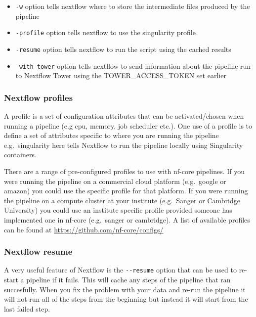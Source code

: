 \documentclass[11pt]{article}
\providecommand{\tightlist}{%
      \setlength{\itemsep}{0pt}\setlength{\parskip}{0pt}}
\begin{document}
\begin{itemize}
\tightlist
\item
  \texttt{-w} option tells nextflow where to store the intermediate
  files produced by the pipeline\\
\item
  \texttt{-profile} option tells nextflow to use the singularity
  profile\\
\item
  \texttt{-resume} option tells nextflow to run the script using the
  cached results\\
\item
  \texttt{-with-tower} option tells nextflow to send information about
  the pipeline run to Nextflow Tower using the TOWER\_ACCESS\_TOKEN set
  earlier
\end{itemize}

    \hypertarget{nextflow-profiles}{%
\subsubsection{Nextflow profiles}\label{nextflow-profiles}}

A profile is a set of configuration attributes that can be
activated/chosen when running a pipeline (e.g cpu, memory, job scheduler
etc.). One use of a profile is to define a set of attributes specific to
where you are running the pipeline e.g.~singularity here tells Nextflow
to run the pipeline locally using Singularity containers.

There are a range of pre-configured profiles to use with nf-core
pipelines. If you were running the pipeline on a commercial cloud
platform (e.g.~google or amazon) you could use the specific profile for
that platform. If you were running the pipeline on a compute cluster at
your institute (e.g.~Sanger or Cambridge University) you could use an
institute specific profile provided someone has implemented one in
nf-core (e.g.~sanger or cambridge). A list of available profiles can be
found at \url{https://github.com/nf-core/configs/}

    \hypertarget{nextflow-resume}{%
\subsubsection{Nextflow resume}\label{nextflow-resume}}

A very useful feature of Nextflow is the \texttt{-\/-resume} option that
can be used to re-start a pipeline if it fails. This will cache any
steps of the pipeline that ran succesfully. When you fix the problem
with your data and re-run the pipeline it will not run all of the steps
from the beginning but instead it will start from the last failed step.
\end{document}
